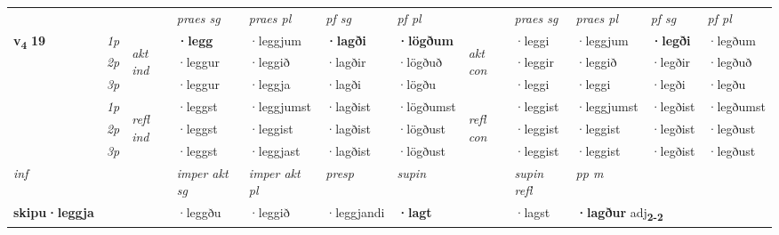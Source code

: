 \begin{longtable}[l]{X>{\footnotesize\itshape}llXXXXlXXXX}
 & &   & \textit{praes sg}  & \textit{praes pl}    & \textit{ pf sg} & \textit{pf pl} & & \textit{praes sg}  & \textit{praes pl}    & \textit{pf sg} & \textit{pf pl }  \\ \cmidrule{4-7} \cmidrule{9-12}
 \multirow{2}{*}{{{\textbf{v{\textsubscript{4}}} \Large{\textbf{19}}}}}  & 1p & \multirow{3}{*}{\begin{turn}{90}\textit{akt ind}\end{turn}} & \textbf{·legg} & ·leggjum & \textbf{·lagði} & \textbf{·lögðum} & \multirow{3}{*}{\begin{turn}{90}\textit{akt con}\end{turn}} &·leggi & ·leggjum & \textbf{·legði} & ·legðum\\*
 & 2p &  &  ·leggur  & ·leggið & ·lagðir & ·lögðuð & & ·leggir & ·leggið & ·legðir & ·legðuð \\*
 & 3p &  & ·leggur & ·leggja & ·lagði & ·lögðu & & ·leggi & ·leggi& ·legði & ·legðu \\*
\cmidrule{4-7} \cmidrule{9-12}
 & 1p & \multirow{3}{*}{\begin{turn}{90}\textit{refl ind}\end{turn}}  & ·leggst & ·leggjumst & ·lagðist & ·lögðumst & \multirow{3}{*}{\begin{turn}{90}\textit{refl con}\end{turn}}  &·leggist & ·leggjumst & ·legðist & ·legðumst \\*
 & 2p &  & ·leggst & ·leggist & ·lagðist & ·lögðust & &·leggist & ·leggist & ·legðist & ·legðust \\*
 & 3p  & & ·leggst & ·leggjast & ·lagðist & ·lögðust & & ·leggist & ·leggist& ·legðist & ·legðust \\*
\cmidrule{4-7} \cmidrule{9-12}

   {\textit{inf}} & &  & \textit{imper akt sg} & \textit{imper akt pl}   & \textit{presp} & \textit{supin} && \textit{supin refl} & \textit{pp m} \\*
  {\textbf{skipu\allowbreak ·leggja}} & && ·leggðu  & ·leggið   & ·leggjandi &  \textbf{·lagt} && ·lagst & \multicolumn{2}{l}{\textbf{·lagður} adj\textbf{\textsubscript{2-2}}} \\*

\midrule


\end{longtable}
